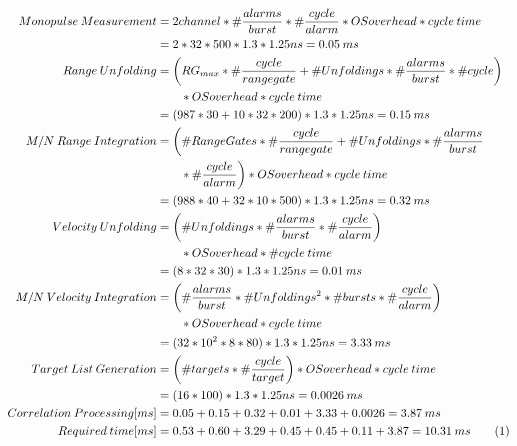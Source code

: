 \begin{align*}
	\label{aa:scheme1:core4:equ3}
		Monopulse \: Measurement &= 2channel * \#\frac{alarms}{burst} * \#\frac{cycle}{alarm} * OSoverhead * cycle \: time \\
		&= 2 * 32 * 500 * 1.3 * 1.25ns = 0.05 \: ms \\
		Range \: Unfolding &= \bigg(RG_{max} * \#\frac{cycle}{rangegate} + \# Unfoldings * \#\frac{alarms}{burst} * \#cycle\bigg) \\
		& \qquad *OSoverhead * cycle \: time \\
		&= (987 * 30 + 10 * 32 * 200) * 1.3 * 1.25ns = 0.15 \: ms \\
		M/N \: Range \: Integration &= \bigg(\#RangeGates * \#\frac{cycle}{rangegate} + \#Unfoldings * \#\frac{alarms}{burst} \\
		&\qquad * \#\frac{cycle}{alarm}\bigg) * OSoverhead *cycle \: time \\
		&= (988 * 40 + 32 * 10 * 500) * 1.3 * 1.25ns = 0.32 \: ms \\
		Velocity \: Unfolding &= \bigg(\#Unfoldings * \#\frac{alarms}{burst} * \#\frac{cycle}{alarm}\bigg) \\
		& \qquad * OSoverhead * \#cycle \: time \\
		&= (8 * 32 * 30) * 1.3 * 1.25ns = 0.01 \: ms \\
		M/N \: Velocity \: Integration &= \bigg(\#\frac{alarms}{burst} * \#Unfoldings^{2} * \#bursts * \#\frac{cycle}{alarm}\bigg) \\
		& \qquad * OSoverhead * cycle \: time \\
		&= (32 * 10^{2} * 8 * 80) * 1.3 * 1.25ns =  3.33 \: ms \\
		Target \: List \: Generation &= \bigg(\#targets * \#\frac{cycle}{target}\bigg) * OSoverhead * cycle \: time \\
		&= (16 * 100) * 1.3 * 1.25ns = 0.0026 \: ms \\
		Correlation \: Processing[ms] &= 0.05 + 0.15 + 0.32 + 0.01 + 3.33 + 0.0026 = 3.87 \: ms \\
		Required \: time[ms] &= 0.53 + 0.60 + 3.29 + 0.45 + 0.45 + 0.11 + 3.87 = 10.31 \: ms \stepcounter{equation}\tag{\theequation}
\end{align*}


